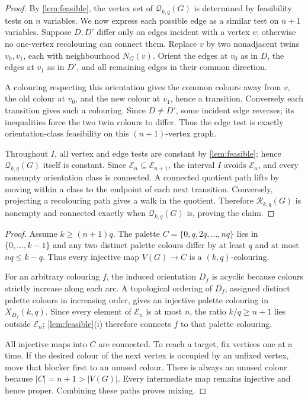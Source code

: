 \documentclass[11pt,a4paper]{article}
\theoremstyle{plain}
\theoremstyle{definition}
\theoremstyle{remark}
\newcommand{\cE}{\mathcal E}
\newcommand{\cR}{\mathcal R}
\newcommand{\cQ}{\mathcal Q}
\begin{document}
\label{pf:local}
\proplocal*
\begin{proof}
By \cref{lem:feasible}, the vertex set of $\cQ_{k,q}(G)$ is determined by feasibility
tests on $n$ variables.  We now express each possible edge as a similar test on $n+1$
variables.  Suppose $D,D'$ differ only on edges incident with a vertex $v$; otherwise
no one-vertex recolouring can connect them.  Replace $v$ by two nonadjacent twins
$v_0,v_1$, each with neighbourhood $N_G(v)$.  Orient the edges at $v_0$ as in $D$, the
edges at $v_1$ as in $D'$, and all remaining edges in their common direction.

A colouring respecting this orientation gives the common colours away from $v$, the
old colour at $v_0$, and the new colour at $v_1$, hence a transition.  Conversely each
transition gives such a colouring.  Since $D\ne D'$, some incident edge reverses; its
inequalities force the two twin colours to differ.  Thus the edge test is exactly
orientation-class feasibility on this $(n+1)$-vertex graph.

Throughout $I$, all vertex and edge tests are constant by \cref{lem:feasible}; hence
$\cQ_{k,q}(G)$ itself is constant.  Since $\cE_n\subseteq\cE_{n+1}$, the interval
$I$ avoids $\cE_n$, and every nonempty orientation class is connected.  A connected
quotient path lifts by moving within a class to the endpoint of each next transition.
Conversely, projecting a recolouring path gives a walk in the quotient.  Therefore
$\cR_{k,q}(G)$ is nonempty and connected exactly when $\cQ_{k,q}(G)$ is, proving the
claim.
\end{proof}

\label{pf:eventual}
\lemeventual*
\begin{proof}
Assume $k\ge(n+1)q$.  The palette
$C=\{0,q,2q,\ldots,nq\}$ lies in $\{0,\ldots,k-1\}$ and any two distinct palette
colours differ by at least $q$ and at most $nq\le k-q$.  Thus every injective map
$V(G)\to C$ is a $(k,q)$-colouring.

For an arbitrary colouring $f$, the induced orientation $D_f$ is acyclic because
colours strictly increase along each arc.  A topological ordering of $D_f$, assigned
distinct palette colours in increasing order, gives an injective palette colouring in
$X_{D_f}(k,q)$.  Since every element of $\cE_n$ is at most $n$, the ratio $k/q\ge n+1$
lies outside $\cE_n$; \cref{lem:feasible}(i) therefore connects $f$ to that palette
colouring.

All injective maps into $C$ are connected.  To reach a target, fix vertices one at a
time.  If the desired colour of the next vertex is occupied by an unfixed vertex, move
that blocker first to an unused colour.  There is always an unused colour because
$|C|=n+1>|V(G)|$.  Every intermediate map remains injective and hence proper.  Combining
these paths proves mixing.
\end{proof}
\end{document}
